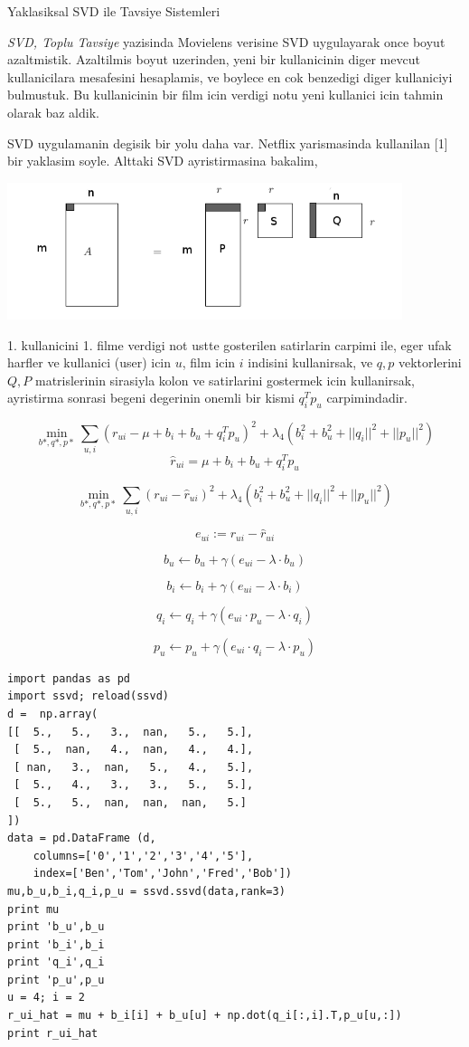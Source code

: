 \documentclass[12pt,fleqn]{article}\usepackage{../common}
\begin{document}
Yaklasiksal SVD ile Tavsiye Sistemleri

{\em SVD, Toplu Tavsiye} yazisinda Movielens verisine SVD uygulayarak once
boyut azaltmistik. Azaltilmis boyut uzerinden, yeni bir kullanicinin diger
mevcut kullanicilara mesafesini hesaplamis, ve boylece en cok benzedigi
diger kullaniciyi bulmustuk. Bu kullanicinin bir film icin verdigi notu yeni
kullanici icin tahmin olarak baz aldik. 

SVD uygulamanin degisik bir yolu daha var. Netflix yarismasinda kullanilan
[1] bir yaklasim soyle. Alttaki SVD ayristirmasina bakalim, 

\includegraphics[height=4cm]{svdapprox_1.png}

1. kullanicini 1. filme verdigi not ustte gosterilen satirlarin carpimi
ile, eger ufak harfler ve kullanici (user) icin $u$, film icin $i$ indisini
kullanirsak, ve $q,p$ vektorlerini $Q,P$ matrislerinin sirasiyla kolon ve
satirlarini gostermek icin kullanirsak, ayristirma sonrasi begeni degerinin
onemli bir kismi $q_i^Tp_u$ carpimindadir.



$$
\min_{b*,q*,p*} \sum_{u,i} (r_{ui} - \mu + b_i + b_u + q_i^Tp_u)^2 + 
\lambda_4 (b_i^2 + b_u^2 + ||q_i||^2 + ||p_u||^2)
$$
$$
\hat{r}_{ui} = \mu + b_i + b_u + q_i^Tp_u
$$

$$
\min_{b*,q*,p*} \sum_{u,i} (r_{ui} - \hat{r}_{ui})^2 + 
\lambda_4 (b_i^2 + b_u^2 + ||q_i||^2 + ||p_u||^2)
$$

$$ e_{ui} := r_{ui} - \hat{r}_{ui} $$

$$
b_u \leftarrow b_u + \gamma (e_{ui} - \lambda \cdot b_u)
$$

$$
b_i \leftarrow b_i + \gamma (e_{ui} - \lambda \cdot b_i)
$$

$$
q_i \leftarrow q_i + \gamma (e_{ui}\cdot p_u - \lambda \cdot q_i)
$$

$$
p_u \leftarrow p_u + \gamma (e_{ui}\cdot q_i - \lambda \cdot p_u)
$$




\begin{verbatim}
import pandas as pd
import ssvd; reload(ssvd)
d =  np.array(
[[  5.,   5.,   3.,  nan,   5.,   5.],
 [  5.,  nan,   4.,  nan,   4.,   4.],
 [ nan,   3.,  nan,   5.,   4.,   5.],
 [  5.,   4.,   3.,   3.,   5.,   5.],
 [  5.,   5.,  nan,  nan,  nan,   5.]
])
data = pd.DataFrame (d,
    columns=['0','1','2','3','4','5'],
    index=['Ben','Tom','John','Fred','Bob'])
mu,b_u,b_i,q_i,p_u = ssvd.ssvd(data,rank=3)
print mu
print 'b_u',b_u
print 'b_i',b_i
print 'q_i',q_i
print 'p_u',p_u
u = 4; i = 2
r_ui_hat = mu + b_i[i] + b_u[u] + np.dot(q_i[:,i].T,p_u[u,:])
print r_ui_hat
\end{verbatim}
\end{document}
